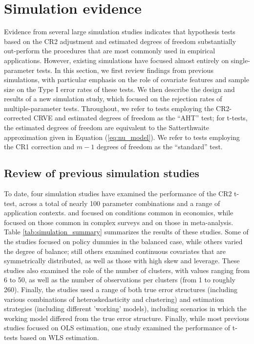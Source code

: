 \documentclass[draft]{ectaart}\usepackage[]{graphicx}\usepackage[]{color}
\begin{document}
\section{Simulation evidence}
\label{sec:simulation}

Evidence from several large simulation studies indicates that hypothesis tests based on the CR2 adjustment and estimated degrees of freedom substantially out-perform the procedures that are most commonly used in empirical applications.
However, existing simulations have focused almost entirely on single-parameter tests. 
In this section, we first review findings from previous simulations, with particular emphasis on the role of covariate features and sample size on the Type I error rates of these tests.
We then describe the design and results of a new simulation study, which focused on the rejection rates of multiple-parameter tests.
  Throughout, we refer to tests employing the CR2-corrected CRVE and estimated degrees of freedom as the ``AHT'' test; for t-tests, the estimated degrees of freedom are equivalent to the Satterthwaite approximation given in Equation (\ref{eq:nu_model}). 
We refer to tests employing the CR1 correction and $m - 1$ degrees of freedom as the ``standard'' test. 

\subsection{Review of previous simulation studies}

To date, four simulation studies have examined the performance of the CR2 t-test, across a total of nearly 100 parameter combinations and a range of application contexts.
\citet{Cameron2015practitioners} and \citet{Imbens2015robust} focused on conditions common in economics, while \citet{Bell2002bias} focused on those common in complex surveys and \citet{Tipton2015small-t} on those in meta-analysis. 
Table \ref{tab:simulation_summary} summarizes the results of these studies.
Some of the studies focused on policy dummies in the balanced case, while others varied the degree of balance; still others examined continuous covariates that are symmetrically distributed, as well as those with high skew and leverage.
These studies also examined the role of the number of clusters, with values ranging from 6 to 50, as well as the number of observations per clusters (from 1 to roughly 260).
Finally, the studies used a range of both true error structures (including various combinations of heteroskedasticity and clustering) and estimation strategies (including different 'working' models), including scenarios in which the working model differed from the true error structure.
Finally, while most previous studies focused on OLS estimation, one study \citep{Tipton2015small-t} examined the performance of t-tests based on WLS estimation.
\end{document}
